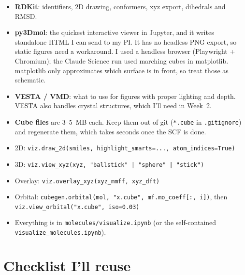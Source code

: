 \documentclass[11pt,a4paper]{article}
\begin{document}
\begin{itemize}
  \item \textbf{RDKit}: identifiers, 2D drawing, conformers, xyz export, dihedrals and RMSD.
  \item \textbf{py3Dmol}: the quickest interactive viewer in Jupyter, and it writes standalone
  HTML I can send to my PI. It has no headless PNG export, so static figures need a workaround.
  I used a headless browser (Playwright + Chromium); the Claude Science run used marching
  cubes in matplotlib. matplotlib only approximates which surface is in front, so treat those
  as schematic.
  \item \textbf{VESTA / VMD}: what to use for figures with proper lighting and depth. VESTA also
  handles crystal structures, which I'll need in Week~2.
  \item \textbf{Cube files} are 3--5~MB each. Keep them out of git (\texttt{*.cube} in
  \texttt{.gitignore}) and regenerate them, which takes seconds once the SCF is done.
\end{itemize}

\begin{howto}
\raggedright
\begin{itemize}[leftmargin=*]
  \item 2D: \texttt{viz.draw\_2d(smiles, highlight\_smarts=..., atom\_indices=True)}
  \item 3D: \texttt{viz.view\_xyz(xyz, "ballstick" | "sphere" | "stick")}
  \item Overlay: \texttt{viz.overlay\_xyz(xyz\_mmff, xyz\_dft)}
  \item Orbital: \texttt{cubegen.orbital(mol, "x.cube", mf.mo\_coeff[:, i])}, then
  \texttt{viz.view\_orbital("x.cube", iso=0.03)}
  \item Everything is in \texttt{molecules/visualize.ipynb} (or the self-contained
  \texttt{visualize\_molecules.ipynb}).
\end{itemize}
\end{howto}

\section{Checklist I'll reuse}
\end{document}
